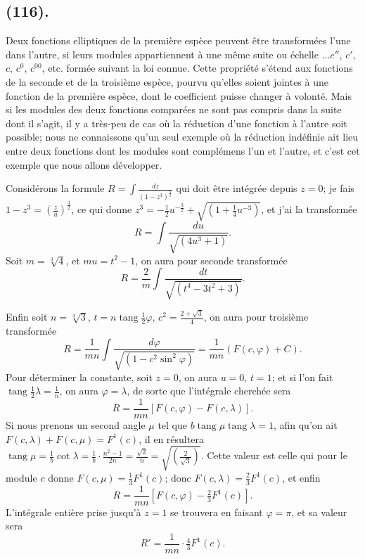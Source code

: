 \documentclass{article}
\begin{document}
\subsection*{(116).}

Deux fonctions elliptiques de la première espèce peuvent être transformées l'une dans l'autre, si leurs modules appartiennent à une même suite ou échelle $\ldots c''$, $c'$, $c$, $c^{0}$, $c^{00}$, etc. formée suivant la loi connue. Cette propriété s'étend aux fonctions de la seconde et de la troisième espèce, pourvu qu'elles soient jointes à une fonction de la première espèce, dont le coefficient puisse changer à volonté. Mais si les modules des deux fonctions comparées ne sont pas compris dans la suite dont il s'agit, il y a très-peu de cas où la réduction d'une fonction à l'autre soit possible; nous ne connaissons qu'un seul exemple où la réduction indéfinie ait lieu entre deux fonctions dont les modules sont complémens l'un et l'autre, et c'est cet exemple que nous allons développer.

Considérons la formule $R=\displaystyle\int\frac{dz}{(1-z^{3})^{\frac{2}{3}}}$ qui doit être intégrée depuis $z=0$; je fais $1-z^{3}=\left(\frac{z}{u}\right)^{\frac{3}{2}}$, ce qui donne $z^{3}=-\frac{1}{2}u^{-\frac{3}{2}}+\sqrt{(1+\frac{1}{4}u^{-3})}$, et j'ai la transformée
\[ R=\int\frac{du}{\sqrt{(4u^{3}+1)}}. \]
Soit $m=\sqrt[3]{4}$, et $mu=t^{2}-1$, on aura pour seconde transformée
\[ R=\frac{2}{m}\int\frac{dt}{\sqrt{(t^{4}-3t^{2}+3)}}. \]

Enfin soit $n=\sqrt[4]{3}$, $t=n\operatorname{tang}\frac{1}{2}\varphi$, $c^{2}=\frac{2+\sqrt{3}}{4}$, on aura pour troisième transformée
\[ R=\frac{1}{mn}\int\frac{d\varphi}{\sqrt{(1-c^{2}\sin^{2}\varphi)}}=\frac{1}{mn}(F(c,\varphi)+C). \]
Pour déterminer la constante, soit $z=0$, on aura $u=0$, $t=1$; et si l'on fait $\operatorname{tang}\frac{1}{2}\lambda=\frac{1}{n}$, on aura $\varphi=\lambda$, de sorte que l'intégrale cherchée sera
\[ R=\frac{1}{mn}[F(c,\varphi)-F(c,\lambda)]. \]
Si nous prenons un second angle $\mu$ tel que $b\operatorname{tang}\mu\operatorname{tang}\lambda=1$, afin qu'on ait $F(c,\lambda)+F(c,\mu)=F^{1}(c)$, il en résultera $\operatorname{tang}\mu=\frac{1}{b}\cot\lambda=\frac{1}{b}\cdot\frac{n^{2}-1}{2n}=\frac{\sqrt{2}}{n}=\sqrt{\left(\frac{2}{\sqrt{3}}\right)}$. Cette valeur est celle qui pour le module $c$ donne $F(c,\mu)=\frac{1}{3}F^{1}(c)$; donc $F(c,\lambda)=\frac{2}{3}F^{1}(c)$, et enfin
\[ R=\frac{1}{mn}[F(c,\varphi)-\tfrac{2}{3}F^{1}(c)]. \]
L'intégrale entière prise jusqu'à $z=1$ se trouvera en faisant $\varphi=\pi$, et sa valeur sera
\[ R'=\frac{1}{mn}\cdot\tfrac{4}{3}F^{1}(c). \]
\end{document}
